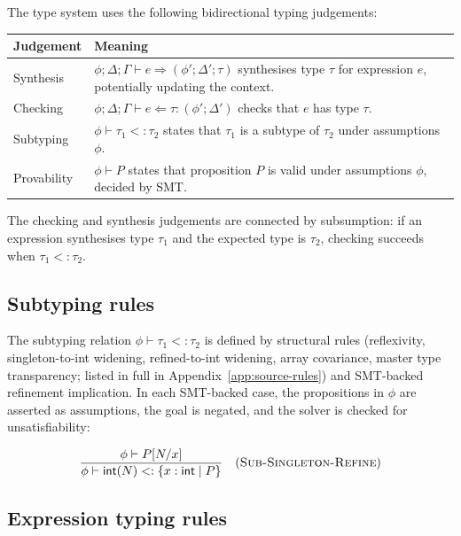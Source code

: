 The type system uses the following bidirectional typing judgements:

\begin{center}
\small
\begin{tabularx}{0.96\textwidth}{>{\raggedright\arraybackslash}p{} >{\raggedright\arraybackslash}X}
\toprule
\textbf{Judgement} & \textbf{Meaning} \\
\midrule
Synthesis & $\phi; \Delta; \Gamma \vdash e \Rightarrow (\phi'; \Delta'; \tau)$ synthesises type $\tau$ for expression $e$, potentially updating the context. \\
Checking & $\phi; \Delta; \Gamma \vdash e \Leftarrow \tau : (\phi'; \Delta')$ checks that $e$ has type $\tau$. \\
Subtyping & $\phi \vdash \tau_1 <: \tau_2$ states that $\tau_1$ is a subtype of $\tau_2$ under assumptions $\phi$. \\
Provability & $\phi \vdash P$ states that proposition $P$ is valid under assumptions $\phi$, decided by SMT. \\
\bottomrule
\end{tabularx}
\end{center}

The checking and synthesis judgements are connected by subsumption: if an expression synthesises type $\tau_1$ and the expected type is $\tau_2$, checking succeeds when $\tau_1 <: \tau_2$.

\subsection{Subtyping rules}

The subtyping relation $\phi \vdash \tau_1 <: \tau_2$ is defined by structural rules (reflexivity, singleton-to-int widening, refined-to-int widening, array covariance, master type transparency; listed in full in Appendix~\ref{app:source-rules}) and SMT-backed refinement implication. In each SMT-backed case, the propositions in $\phi$ are asserted as assumptions, the goal is negated, and the solver is checked for unsatisfiability:

$$\frac{\phi \vdash P[N/x]}{\phi \vdash \textsf{int}(N) <: \{x: \textsf{int} \mid P\}} \quad (\textsc{Sub-Singleton-Refine})$$

\subsection{Expression typing rules}\label{sec:expr-typing-rules}

